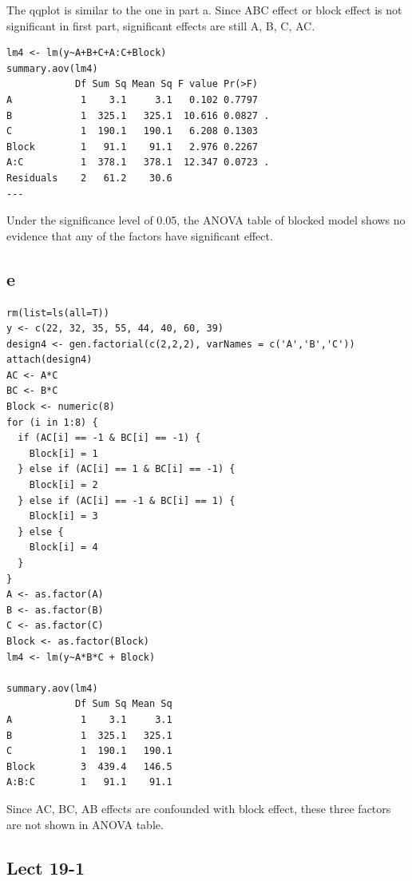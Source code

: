 \documentclass[11pt,letterpaper]{article}
\begin{document}
\noindent The qqplot is similar to the one in part a. Since ABC effect or block effect is not significant in first part, significant effects are still A, B, C, AC.

\begin{verbatim}
lm4 <- lm(y~A+B+C+A:C+Block)
summary.aov(lm4)
            Df Sum Sq Mean Sq F value Pr(>F)  
A            1    3.1     3.1   0.102 0.7797  
B            1  325.1   325.1  10.616 0.0827 .
C            1  190.1   190.1   6.208 0.1303  
Block        1   91.1    91.1   2.976 0.2267  
A:C          1  378.1   378.1  12.347 0.0723 .
Residuals    2   61.2    30.6                 
---
\end{verbatim}
\noindent Under the significance level of 0.05, the ANOVA table of blocked model shows no evidence that any of the factors have significant effect. 

\subsection*{e}
\begin{verbatim}
rm(list=ls(all=T))
y <- c(22, 32, 35, 55, 44, 40, 60, 39)
design4 <- gen.factorial(c(2,2,2), varNames = c('A','B','C'))
attach(design4)
AC <- A*C
BC <- B*C
Block <- numeric(8)
for (i in 1:8) {
  if (AC[i] == -1 & BC[i] == -1) {
    Block[i] = 1
  } else if (AC[i] == 1 & BC[i] == -1) {
    Block[i] = 2
  } else if (AC[i] == -1 & BC[i] == 1) {
    Block[i] = 3
  } else {
    Block[i] = 4
  }
}
A <- as.factor(A)
B <- as.factor(B)
C <- as.factor(C)
Block <- as.factor(Block)
lm4 <- lm(y~A*B*C + Block)

summary.aov(lm4)
            Df Sum Sq Mean Sq
A            1    3.1     3.1
B            1  325.1   325.1
C            1  190.1   190.1
Block        3  439.4   146.5
A:B:C        1   91.1    91.1
\end{verbatim}

\noindent Since AC, BC, AB effects are confounded with block effect, these three factors are not shown in ANOVA table. 

\newpage
\subsection*{Lect 19-1}
\end{document}
